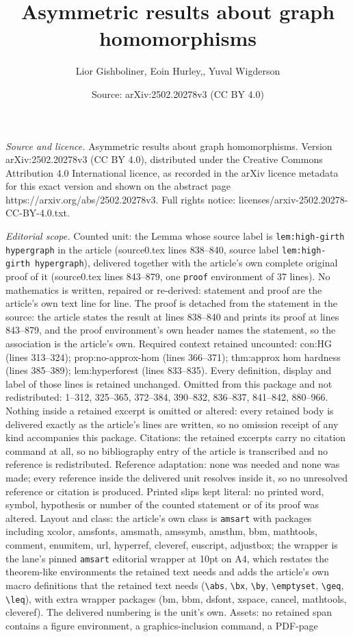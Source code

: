 \documentclass[10pt,a4paper]{amsart}
\title[Asymmetric results about graph homomorphisms]{Asymmetric results about graph homomorphisms}
\author{Lior Gishboliner, Eoin Hurley,, Yuval Wigderson}
\date{Source: arXiv:2502.20278v3 (CC BY 4.0)}
\begin{document}
\maketitle

\noindent\emph{Source and licence.} Asymmetric results about graph homomorphisms. Version arXiv:2502.20278v3 (CC BY 4.0), distributed under the Creative Commons Attribution 4.0 International licence, as recorded in the arXiv licence metadata for this exact version and shown on the abstract page https://arxiv.org/abs/2502.20278v3. Full rights notice: licenses/arxiv-2502.20278-CC-BY-4.0.txt.\par\smallskip

\noindent\textit{Editorial scope.} Counted unit: the Lemma whose source label is \texttt{lem:high-girth hypergraph} in the article (source0.tex lines 838--840, source label \texttt{lem:high-girth hypergraph}), delivered together with the article's own complete original proof of it (source0.tex lines 843--879, one \texttt{proof} environment of 37 lines). No mathematics is written, repaired or re-derived: statement and proof are the article's own text line for line. The proof is detached from the statement in the source: the article states the result at lines 838--840 and prints its proof at lines 843--879, and the proof environment's own header names the statement, so the association is the article's own. Required context retained uncounted: con:HG (lines 313--324); prop:no-approx-hom (lines 366--371); thm:approx hom hardness (lines 385--389); lem:hyperforest (lines 833--835). Every definition, display and label of those lines is retained unchanged. Omitted from this package and not redistributed: 1--312, 325--365, 372--384, 390--832, 836--837, 841--842, 880--966. Nothing inside a retained excerpt is omitted or altered: every retained body is delivered exactly as the article's lines are written, so no omission receipt of any kind accompanies this package. Citations: the retained excerpts carry no citation command at all, so no bibliography entry of the article is transcribed and no reference is redistributed. Reference adaptation: none was needed and none was made; every reference inside the delivered unit resolves inside it, so no unresolved reference or citation is produced. Printed slips kept literal: no printed word, symbol, hypothesis or number of the counted statement or of its proof was altered. Layout and class: the article's own class is \texttt{amsart} with packages including xcolor, amsfonts, amsmath, amssymb, amsthm, bbm, mathtools, comment, enumitem, url, hyperref, cleveref, euscript, adjustbox; the wrapper is the lane's pinned \texttt{amsart} editorial wrapper at 10pt on A4, which restates the theorem-like environments the retained text needs and adds the article's own macro definitions that the retained text needs (\texttt{\textbackslash abs}, \texttt{\textbackslash bx}, \texttt{\textbackslash by}, \texttt{\textbackslash emptyset}, \texttt{\textbackslash geq}, \texttt{\textbackslash leq}), with extra wrapper packages (bm, bbm, dsfont, xspace, cancel, mathtools, cleveref). The delivered numbering is the unit's own. Assets: no retained span contains a figure environment, a graphics-inclusion command, a PDF-page 
\end{document}
